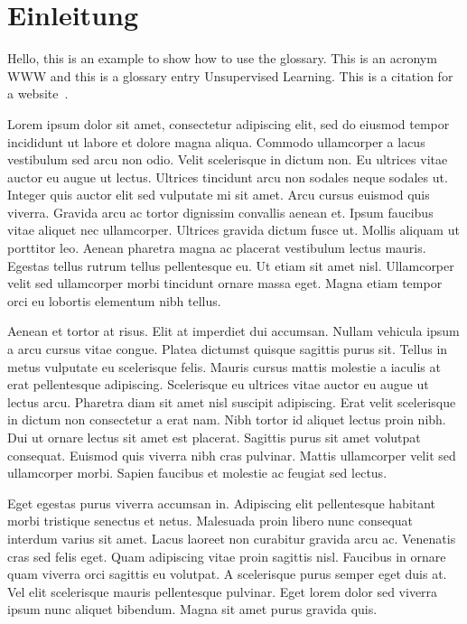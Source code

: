 \chapter{Einleitung}

Hello, this is an example to show how to use the glossary. This is an acronym \gls{WWW} and this is a
glossary entry \gls{Unsupervised Learning}. This is a citation for a website~\cite{website:this_repo}.

Lorem ipsum dolor sit amet, consectetur adipiscing elit, sed do eiusmod tempor incididunt ut labore et dolore magna aliqua. Commodo ullamcorper a lacus vestibulum sed arcu non odio. Velit scelerisque in dictum non. Eu ultrices vitae auctor eu augue ut lectus. Ultrices tincidunt arcu non sodales neque sodales ut. Integer quis auctor elit sed vulputate mi sit amet. Arcu cursus euismod quis viverra. Gravida arcu ac tortor dignissim convallis aenean et. Ipsum faucibus vitae aliquet nec ullamcorper. Ultrices gravida dictum fusce ut. Mollis aliquam ut porttitor leo. Aenean pharetra magna ac placerat vestibulum lectus mauris. Egestas tellus rutrum tellus pellentesque eu. Ut etiam sit amet nisl. Ullamcorper velit sed ullamcorper morbi tincidunt ornare massa eget. Magna etiam tempor orci eu lobortis elementum nibh tellus.

Aenean et tortor at risus. Elit at imperdiet dui accumsan. Nullam vehicula ipsum a arcu cursus vitae congue. Platea dictumst quisque sagittis purus sit. Tellus in metus vulputate eu scelerisque felis. Mauris cursus mattis molestie a iaculis at erat pellentesque adipiscing. Scelerisque eu ultrices vitae auctor eu augue ut lectus arcu. Pharetra diam sit amet nisl suscipit adipiscing. Erat velit scelerisque in dictum non consectetur a erat nam. Nibh tortor id aliquet lectus proin nibh. Dui ut ornare lectus sit amet est placerat. Sagittis purus sit amet volutpat consequat. Euismod quis viverra nibh cras pulvinar. Mattis ullamcorper velit sed ullamcorper morbi. Sapien faucibus et molestie ac feugiat sed lectus.

Eget egestas purus viverra accumsan in. Adipiscing elit pellentesque habitant morbi tristique senectus et netus. Malesuada proin libero nunc consequat interdum varius sit amet. Lacus laoreet non curabitur gravida arcu ac. Venenatis cras sed felis eget. Quam adipiscing vitae proin sagittis nisl. Faucibus in ornare quam viverra orci sagittis eu volutpat. A scelerisque purus semper eget duis at. Vel elit scelerisque mauris pellentesque pulvinar. Eget lorem dolor sed viverra ipsum nunc aliquet bibendum. Magna sit amet purus gravida quis.

